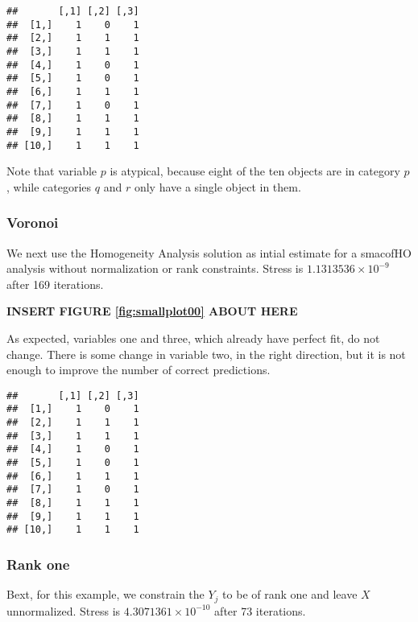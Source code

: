 \documentclass[
  12pt,
]{article}
\begin{document}
\begin{verbatim}
##       [,1] [,2] [,3]
##  [1,]    1    0    1
##  [2,]    1    1    1
##  [3,]    1    1    1
##  [4,]    1    0    1
##  [5,]    1    0    1
##  [6,]    1    1    1
##  [7,]    1    0    1
##  [8,]    1    1    1
##  [9,]    1    1    1
## [10,]    1    1    1
\end{verbatim}

Note that variable \(p\) is atypical, because eight of the ten objects
are in category \(p\), while categories \(q\) and \(r\) only have a single object in them.

\subsubsection{Voronoi}\label{voronoi}

We next use the Homogeneity Analysis solution as intial estimate
for a smacofHO analysis without normalization or rank constraints.
Stress is \ensuremath{1.1313536\times 10^{-9}} after 169 iterations.

\begin{greybox}

\begin{center}
\textbf{INSERT FIGURE \ref{fig:smallplot00} ABOUT HERE}

\end{center}

\end{greybox}

As expected, variables one and three, which already have perfect fit, do not change. There is some change in variable two, in the right
direction, but it is not enough to improve the number of correct
predictions.

\begin{verbatim}
##       [,1] [,2] [,3]
##  [1,]    1    0    1
##  [2,]    1    1    1
##  [3,]    1    1    1
##  [4,]    1    0    1
##  [5,]    1    0    1
##  [6,]    1    1    1
##  [7,]    1    0    1
##  [8,]    1    1    1
##  [9,]    1    1    1
## [10,]    1    1    1
\end{verbatim}

\subsubsection{Rank one}\label{rank-one}

Bext, for this example, we constrain the \(Y_j\) to be of rank one
and leave \(X\) unnormalized. Stress is \ensuremath{4.3071361\times 10^{-10}} after 73 iterations.
\end{document}
